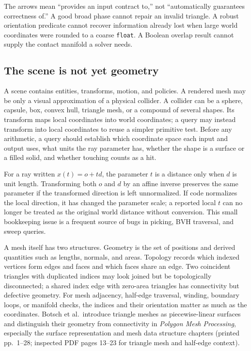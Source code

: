 The arrows mean ``provides an input contract to,'' not ``automatically guarantees correctness of.'' A good broad phase cannot repair an invalid triangle. A robust orientation predicate cannot recover information already lost when large world coordinates were rounded to a coarse \texttt{float}. A Boolean overlap result cannot supply the contact manifold a solver needs.

\subsection{The scene is not yet geometry}\label{03-visual-computing-i-ch020-the-scene-is-not-yet-geometry}

A scene contains entities, transforms, motion, and policies. A rendered mesh may be only a visual approximation of a physical collider. A collider can be a sphere, capsule, box, convex hull, triangle mesh, or a compound of several shapes. Its transform maps local coordinates into world coordinates; a query may instead transform into local coordinates to reuse a simpler primitive test. Before any arithmetic, a query should establish which coordinate space each input and output uses, what units the ray parameter has, whether the shape is a surface or a filled solid, and whether touching counts as a hit.

For a ray written \(x(t)=o+td\), the parameter \(t\) is a distance only when \(d\) is unit length. Transforming both \(o\) and \(d\) by an affine inverse preserves the same parameter if the transformed direction is left unnormalized. If code normalizes the local direction, it has changed the parameter scale; a reported local \(t\) can no longer be treated as the original world distance without conversion. This small bookkeeping issue is a frequent source of bugs in picking, BVH traversal, and sweep queries.

A mesh itself has two structures. Geometry is the set of positions and derived quantities such as lengths, normals, and areas. Topology records which indexed vertices form edges and faces and which faces share an edge. Two coincident triangles with duplicated indices may look joined but be topologically disconnected; a shared index edge with zero-area triangles has connectivity but defective geometry. For mesh adjacency, half-edge traversal, winding, boundary loops, or manifold checks, the indices and their orientation matter as much as the coordinates. Botsch et al.~introduce triangle meshes as piecewise-linear surfaces and distinguish their geometry from connectivity in \emph{Polygon Mesh Processing}, especially the surface representation and mesh data structure chapters (printed pp.~1--28; inspected PDF pages 13--23 for triangle mesh and half-edge context).

